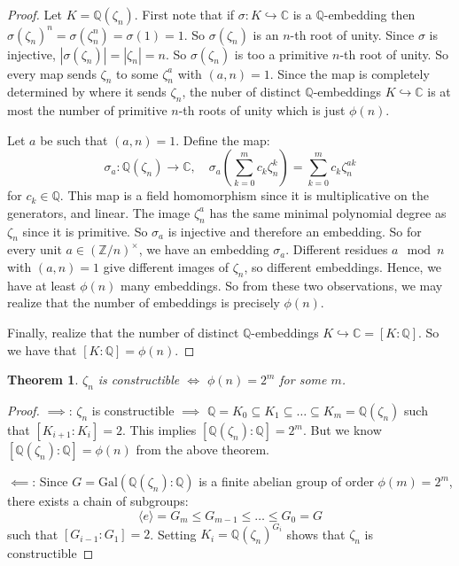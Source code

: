 \documentclass{article}
\theoremstyle{plain}
\newtheorem{thm}{Theorem}
\theoremstyle{definition}
\newcommand{\Q}{\mathbb{Q}}
\newcommand{\C}{\mathbb{C}}
\newcommand{\Z}{\mathbb{Z}}
\begin{document}
\begin{proof}
    Let $K = \Q(\zeta_n)$. First note that if $\sigma: K \hookrightarrow \C$ is a $\Q$-embedding then $\sigma(\zeta_n)^n = \sigma(\zeta_n^n) = \sigma(1) = 1$. So $\sigma(\zeta_n)$ is an $n$-th root of unity. Since $\sigma$ is injective, $|\sigma(\zeta_n)| = |\zeta_n| = n$. So $\sigma(\zeta_n)$ is too a primitive $n$-th root of unity. So every map sends $\zeta_n$ to some $\zeta_n^a$ with $(a,n) = 1$. Since the map is completely determined by where it sends $\zeta_n$, the nuber of distinct $\Q$-embeddings $K \hookrightarrow \C$ is at most the number of primitive $n$-th roots of unity which is just $\phi(n)$. 

    Let $a$ be such that $(a,n) = 1$. Define the map: \begin{equation}
        \sigma_a: \Q(\zeta_n) \rightarrow \C, \quad \sigma_a\left(\sum_{k=0}^m c_k\zeta_n^k\right) = \sum_{k=0}^m c_k \zeta_n^{ak}
    \end{equation} for $c_k \in \Q$. This map is a field homomorphism since it is multiplicative on the generators, and linear. The image $\zeta_n^a$ has the same minimal polynomial degree as $\zeta_n$ since it is primitive. So $\sigma_a$ is injective and therefore an embedding. So for every unit $a \in (\Z/n)^\times$, we have an embedding $\sigma_a$. Different residues $a \mod n$ with $(a,n) = 1$ give different images of $\zeta_n$, so different embeddings. Hence, we have at least $\phi(n)$ many embeddings. So from these two observations, we may realize that the number of embeddings is precisely $\phi(n)$. 

    Finally, realize that the number of distinct $\Q$-embeddings $K \hookrightarrow \C = [K:\Q]$. So we have that $[K:\Q] = \phi(n)$.
\end{proof}


\begin{thm}
    $\zeta_n$ is constructible $\iff$ $\phi(n) = 2^m$ for some $m$.
\end{thm}

\begin{proof}
    $\implies$: $\zeta_n$ is constructible $\implies$ $\Q = K_0 \subseteq K_1 \subseteq \dots \subseteq K_m = \Q(\zeta_n)$ such that $[K_{i+1}: K_i] = 2$. This implies $[\Q(\zeta_n): \Q] = 2^m$. But we know $[\Q(\zeta_n): \Q] = \phi(n)$ from the above theorem. \checkmark

    \noindent $\impliedby$: Since $G = \text{Gal}(\Q(\zeta_n):\Q)$ is a finite abelian group of order $\phi(m) = 2^m$, there exists a chain of subgroups: \begin{equation}
        \langle e \rangle = G_m \leq G_{m-1} \leq \dots \leq G_0 = G
    \end{equation} such that $[G_{i-1}:G_1] = 2$. Setting $K_i = \Q(\zeta_n)^{G_i}$ shows that $\zeta_n$ is constructible \checkmark
\end{proof}
\end{document}
